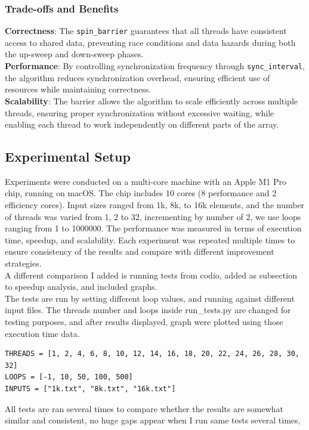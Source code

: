 \documentclass[letterpaper,12pt]{article}
\theoremstyle{remark}
\begin{document}
\subsubsection{Trade-offs and Benefits}

\textbf{Correctness}: The \texttt{spin\_barrier} guarantees that all threads have consistent access to shared data, preventing race conditions and data hazards during both the up-sweep and down-sweep phases.\\
\textbf{Performance}: By controlling synchronization frequency through \texttt{sync\_interval}, the algorithm reduces synchronization overhead, ensuring efficient use of resources while maintaining correctness.\\
\textbf{Scalability}: The barrier allows the algorithm to scale efficiently across multiple threads, ensuring proper synchronization without excessive waiting, while enabling each thread to work independently on different parts of the array.



\subsection{Experimental Setup}
Experiments were conducted on a multi-core machine with an Apple M1 Pro chip, running on macOS. The chip includes 10 cores (8 performance and 2 efficiency cores). Input sizes ranged from 1k, 8k, to 16k elements, and the number of threads was varied from 1, 2 to 32, incrementing by number of 2, we use loops ranging from 1 to 1000000. The performance was measured in terms of execution time, speedup, and scalability. Each experiment was repeated multiple times to ensure consistency of the results and compare with different improvement strategies.\\
A different comparison I added is running tests from codio, added as subsection to speedup analysis, and included graphs.\\
The tests are run by setting different loop values, and running against different input files. The threads number and loops inside run\_tests.py are changed for testing purposes, and after results displayed, graph were plotted using those execution time data.

\begin{verbatim}
THREADS = [1, 2, 4, 6, 8, 10, 12, 14, 16, 18, 20, 22, 24, 26, 28, 30, 32]
LOOPS = [-1, 10, 50, 100, 500]
INPUTS = ["1k.txt", "8k.txt", "16k.txt"]	
\end{verbatim}
All tests are ran several times to compare whether the results are somewhat similar and consistent, no huge gaps appear when I run same tests several times, 
\end{document}
